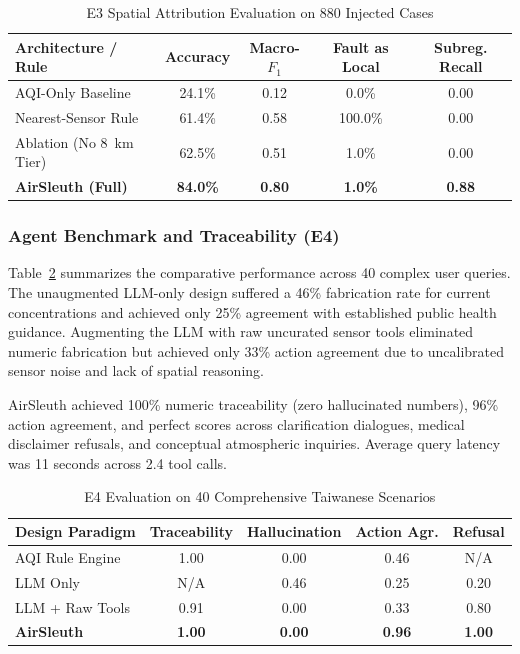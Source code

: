\documentclass[conference]{IEEEtran}
\begin{document}
\begin{table}[h]
\caption{E3 Spatial Attribution Evaluation on 880 Injected Cases}
\label{tab:attribution}
\centering
\begin{tabular}{lcccc}
\toprule
\textbf{Architecture / Rule} & \textbf{Accuracy} & \textbf{Macro-$F_1$} & \textbf{Fault as Local} & \textbf{Subreg. Recall} \\
\midrule
AQI-Only Baseline & 24.1\% & 0.12 & 0.0\% & 0.00 \\
Nearest-Sensor Rule & 61.4\% & 0.58 & 100.0\% & 0.00 \\
Ablation (No 8~km Tier) & 62.5\% & 0.51 & 1.0\% & 0.00 \\
\textbf{AirSleuth (Full)} & \textbf{84.0\%} & \textbf{0.80} & \textbf{1.0\%} & \textbf{0.88} \\
\bottomrule
\end{tabular}
\end{table}

\subsubsection{Agent Benchmark and Traceability (E4)}
Table~\ref{tab:agent_eval} summarizes the comparative performance across 40 complex user queries. The unaugmented LLM-only design suffered a 46\% fabrication rate for current concentrations and achieved only 25\% agreement with established public health guidance. Augmenting the LLM with raw uncurated sensor tools eliminated numeric fabrication but achieved only 33\% action agreement due to uncalibrated sensor noise and lack of spatial reasoning. 

AirSleuth achieved 100\% numeric traceability (zero hallucinated numbers), 96\% action agreement, and perfect scores across clarification dialogues, medical disclaimer refusals, and conceptual atmospheric inquiries. Average query latency was 11 seconds across 2.4 tool calls.

\begin{table}[h]
\caption{E4 Evaluation on 40 Comprehensive Taiwanese Scenarios}
\label{tab:agent_eval}
\centering
\begin{tabular}{lcccc}
\toprule
\textbf{Design Paradigm} & \textbf{Traceability} & \textbf{Hallucination} & \textbf{Action Agr.} & \textbf{Refusal} \\
\midrule
AQI Rule Engine & 1.00 & 0.00 & 0.46 & N/A \\
LLM Only & N/A & 0.46 & 0.25 & 0.20 \\
LLM + Raw Tools & 0.91 & 0.00 & 0.33 & 0.80 \\
\textbf{AirSleuth} & \textbf{1.00} & \textbf{0.00} & \textbf{0.96} & \textbf{1.00} \\
\bottomrule
\end{tabular}
\end{table}
\end{document}

